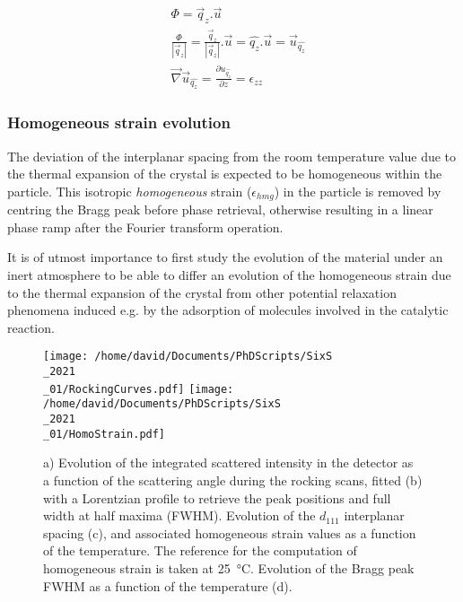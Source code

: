 {\begin{align}
    \label{eq:StrainFromPhase1}
    & \Phi =  \vec{q}_z.\vec{u} \\
    \label{eq:StrainFromPhase2}
    & \frac{\Phi}{|\vec{q}_z|} = \frac{\vec{q}_z}{|\vec{q}_z|}.\vec{u} = \hat{q_z}.\vec{u} = \vec{u}_{\hat{q_z}} \\
    \label{eq:StrainFromPhase3}
    & \vec{\nabla} \vec{u}_{\hat{q_z}} = \frac{\partial u_{\hat{q_z}}}{\partial z} = \epsilon_{zz}
\end{align}

\subsubsection{Homogeneous strain evolution}

The deviation of the interplanar spacing from the room temperature value due to the thermal expansion of the crystal is expected to be homogeneous within the particle.
This isotropic \textit{homogeneous} strain ($\epsilon_{hmg}$) in the particle is removed by centring the Bragg peak before phase retrieval, otherwise resulting in a linear phase ramp after the Fourier transform operation.

It is of utmost importance to first study the evolution of the material under an inert atmosphere to be able to differ an evolution of the homogeneous strain due to the thermal expansion of the crystal from other potential relaxation phenomena induced e.g. by the adsorption of molecules involved in the catalytic reaction.


\begin{figure}[!htb]
    \centering
    \texttt{[image: /home/david/Documents/PhDScripts/SixS\\\_2021\\\_01/RockingCurves.pdf]}
    \texttt{[image: /home/david/Documents/PhDScripts/SixS\\\_2021\\\_01/HomoStrain.pdf]}
    \caption{
        a) Evolution of the integrated scattered intensity in the detector as a function of the scattering angle during the rocking scans, fitted (b) with a Lorentzian profile to retrieve the peak positions and full width at half maxima (FWHM).
        Evolution of the $d_{111}$ interplanar spacing (c), and associated homogeneous strain values as a function of the temperature.
        The reference for the computation of homogeneous strain is taken at \qty{25}{\degreeCelsius}.
        Evolution of the Bragg peak FWHM as a function of the temperature (d).
    }
    \label{fig:AmaterasuHomoStrain}
\end{figure}

}
